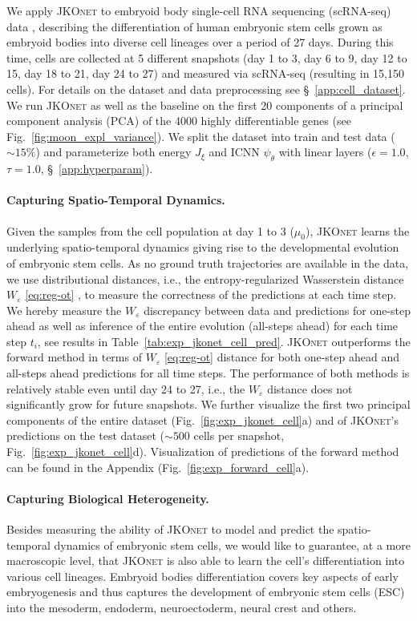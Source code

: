 We apply \textsc{JKOnet} to embryoid body single-cell RNA sequencing (scRNA-seq) data \citep{moon2019}, describing the differentiation of human embryonic stem cells grown as embryoid bodies into diverse cell lineages over a period of 27 days. During this time, cells are collected at 5 different snapshots (day 1 to 3, day 6 to 9, day 12 to 15, day 18 to 21, day 24 to 27) and measured via scRNA-seq (resulting in 15,150 cells). For details on the dataset and data preprocessing see \S~\ref{app:cell_dataset}.
We run \textsc{JKOnet} as well as the baseline on the first 20 components of a principal component analysis (PCA) of the 4000 highly differentiable genes (see Fig.~\ref{fig:moon_expl_variance}).
We split the dataset into train and test data ($\sim 15 \%$) and parameterize both energy $J_\xi$ and ICNN $\psi_\theta$ with linear layers ($\epsilon = 1.0$, $\tau = 1.0$, \S~\ref{app:hyperparam}).

\paragraph{Capturing Spatio-Temporal Dynamics.}
Given the samples from the cell population at day 1 to 3 ($\mu_0$), \textsc{JKOnet} learns the underlying spatio-temporal dynamics giving rise to the developmental evolution of embryonic stem cells. 
As no ground truth trajectories are available in the data, we use distributional distances, i.e., the entropy-regularized Wasserstein distance $W_\varepsilon$ \eqref{eq:reg-ot} \citep{flamary2021pot}, to measure the correctness of the predictions at each time step.
We hereby measure the $W_\varepsilon$ discrepancy between data and predictions for one-step ahead as well as inference of the entire evolution (all-steps ahead) for each time step $t_i$, see results in Table~\ref{tab:exp_jkonet_cell_pred}. \textsc{JKOnet} outperforms the forward method in terms of $W_\varepsilon$ \eqref{eq:reg-ot} distance for both one-step ahead and all-steps ahead predictions for all time steps. 
The performance of both methods is relatively stable even until day 24 to 27, i.e., the $W_\varepsilon$ distance does not significantly grow for future snapshots.
We further visualize the first two principal components of the entire dataset (Fig.~\ref{fig:exp_jkonet_cell}a) and of \textsc{JKOnet}'s predictions on the test dataset ($\sim 500$ cells per snapshot, Fig.~\ref{fig:exp_jkonet_cell}d). Visualization of predictions of the forward method can be found in the Appendix (Fig.~\ref{fig:exp_forward_cell}a). 

\paragraph{Capturing Biological Heterogeneity.}
Besides measuring the ability of \textsc{JKOnet} to model and predict the spatio-temporal dynamics of embryonic stem cells, we would like to guarantee, at a more macroscopic level, that \textsc{JKOnet} is also able to learn the cell's differentiation into various cell lineages.
Embryoid bodies differentiation covers key aspects of early embryogenesis and thus captures the development of embryonic stem cells (ESC) into the mesoderm, endoderm, neuroectoderm, neural crest and others.


